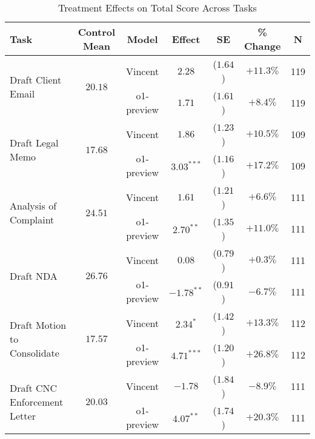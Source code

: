 \begin{table}[!htbp]
\centering
\caption{Treatment Effects on Total Score Across Tasks}
\label{tab:total_score_effects_controls}
\vspace{0.3cm}
\begin{tabular}{lcccccc}
\hline\hline
Task & Control Mean & Model & Effect & SE & \% Change & N \\
\hline
\multirow{2}{*}{Draft Client Email} & \multirow{2}{*}{$20.18$} & Vincent & $2.28$ & ($1.64$) & $+11.3\%$ & 119 \\
& & o1-preview & $1.71$ & ($1.61$) & $+8.4\%$ & 119 \\
\hline
\multirow{2}{*}{Draft Legal Memo} & \multirow{2}{*}{$17.68$} & Vincent & $1.86$ & ($1.23$) & $+10.5\%$ & 109 \\
& & o1-preview & $3.03^{***}$ & ($1.16$) & $+17.2\%$ & 109 \\
\hline
\multirow{2}{*}{Analysis of Complaint} & \multirow{2}{*}{$24.51$} & Vincent & $1.61$ & ($1.21$) & $+6.6\%$ & 111 \\
& & o1-preview & $2.70^{**}$ & ($1.35$) & $+11.0\%$ & 111 \\
\hline
\multirow{2}{*}{Draft NDA} & \multirow{2}{*}{$26.76$} & Vincent & $0.08$ & ($0.79$) & $+0.3\%$ & 111 \\
& & o1-preview & $-1.78^{**}$ & ($0.91$) & $-6.7\%$ & 111 \\
\hline
\multirow{2}{*}{Draft Motion to Consolidate} & \multirow{2}{*}{$17.57$} & Vincent & $2.34^{*}$ & ($1.42$) & $+13.3\%$ & 112 \\
& & o1-preview & $4.71^{***}$ & ($1.20$) & $+26.8\%$ & 112 \\
\hline
\multirow{2}{*}{Draft CNC Enforcement Letter} & \multirow{2}{*}{$20.03$} & Vincent & $-1.78$ & ($1.84$) & $-8.9\%$ & 111 \\
& & o1-preview & $4.07^{**}$ & ($1.74$) & $+20.3\%$ & 111 \\
\hline
\hline\hline
\end{tabular}

\vspace{0.5cm}


\end{table}
